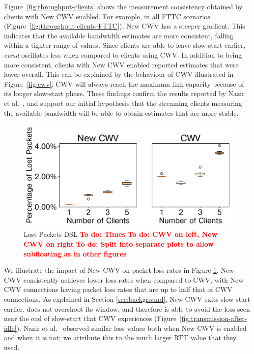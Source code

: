 \documentclass[10pt,sigconf,anonymous]{acmart}
\newcommand{\todo}[1]{\textbf{\textcolor{red}{To do: #1}}}
\begin{document}
Figure~\ref{fig:throughput-clients} shows the measurement consistency obtained by clients with New CWV enabled. For example, in all FTTC scenarios (Figure~\ref{fig:throughput-clients-FTTC}), New CWV has a steeper gradient. This indicates that the available bandwidth estimates are more consistent, falling within a tighter range of values. Since clients are able to leave slow-start earlier, \emph{cwnd} oscillates less when compared to clients using CWV. In addition to being more consistent, clients with New CWV enabled reported estimates that were lower overall. This can be explained by the behaviour of CWV illustrated in Figure~\ref{fig:cwv}: CWV will always reach the maximum link capacity because of its longer slow-start phase. These findings confirm the results reported by Nazir et al.~\cite{Nazir-2014-performance-evaluation-congestion-window-validation-dash-newcwv}, and support our initial hypothesis that the streaming clients measuring the available bandwidth will be able to obtain estimates that are more stable.

\begin{figure}[t!]
  \centering
  \includegraphics[width=.45\textwidth]{figures/lost_packets.pdf}
  \caption{Lost Packets DSL \todo{Times} \todo{CWV on left, New CWV on right} \todo{Split into separate plots to allow subfloating as in other figures}}
  \label{fig:lost-packets}
\end{figure}

We illustrate the impact of New CWV on packet loss rates in Figure \ref{fig:lost-packets}. New CWV consistently achieves lower loss rates when compared to CWV, with New CWV connections having packet loss rates that are up to half that of CWV connections. As explained in Section \ref{sec:background}, New CWV exits slow-start earlier, does not overshoot its window, and therefore is able to avoid the loss seen near the end of slow-start that CWV experiences (Figure~\ref{fig:transmission-after-idle}). Nazir et al.~\cite{Nazir-2014-performance-evaluation-congestion-window-validation-dash-newcwv} observed similar loss values both when New CWV is enabled and when it is not; we attribute this to the much larger RTT value that they used.

\end{document}
